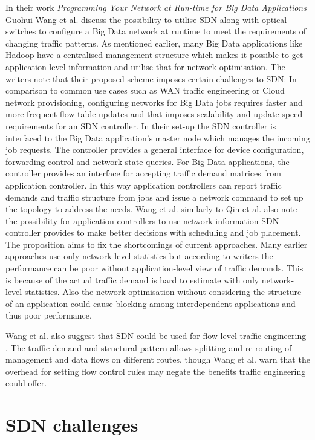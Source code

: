 \documentclass{acm_proc_article-sp}
\begin{document}
In their work \textit{Programming Your Network at Run-time for Big Data Applications} \cite{Wang:2012:PYN:2342441.2342462} Guohui Wang et al. discuss the possibility to utilise SDN along with optical switches to configure a Big Data network at runtime to meet the requirements of changing traffic patterns. As mentioned earlier, many Big Data applications like Hadoop have a centralised management structure which makes it possible to get application-level information and utilise that for network optimisation. The writers note that their proposed scheme imposes certain challenges to SDN: In comparison to common use cases such as WAN traffic engineering or Cloud network provisioning, configuring networks for Big Data jobs requires faster and more frequent flow table updates and that imposes scalability and update speed requirements for an SDN controller. In their set-up the SDN controller is interfaced to the Big Data application's master node which manages the incoming job requests. The controller provides a general interface for device configuration, forwarding control and network state queries. For Big Data applications, the controller provides an interface for accepting traffic demand matrices from application controller. In this way application controllers can report traffic demands and traffic structure from jobs and issue a network command to set up the topology to address the needs. Wang et al. similarly to Qin et al.\cite{Scheduling} also note the possibility for application controllers to use network information SDN controller provides to make better decisions  with scheduling and job placement. The proposition aims to fix the shortcomings of current approaches. Many earlier approaches use only network level statistics but according to writers the performance can be poor without application-level view of traffic demands. This is because of the actual traffic demand is hard to estimate with only network-level statistics. Also the network optimisation without considering the structure of an application could cause blocking among interdependent applications and thus poor performance. 

Wang et al. also suggest that SDN could be used for flow-level traffic engineering \cite{Wang:2012:PYN:2342441.2342462}. The traffic demand and structural pattern  allows splitting and re-routing of management and data flows on different routes, though Wang et al. warn that the overhead for setting flow control rules may negate the benefits traffic engineering could offer.

\section{SDN challenges}
\end{document}
